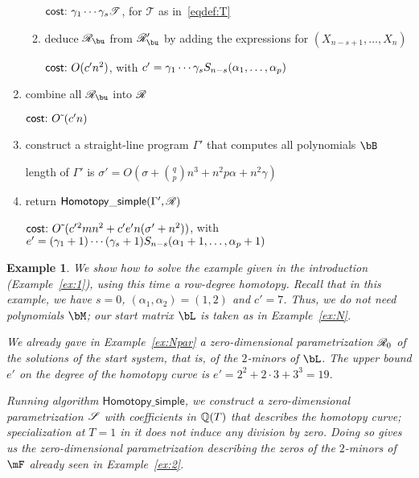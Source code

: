 \documentclass[12pt]{article}
\newtheorem{example}[definition]{Example}
\begin{document}
\begin{algorithm}[!t]
\begin{enumerate}
\begin{enumerate}
\hfill  $\text{\sf{cost:~}} \gamma_1 \cdots \gamma_s \mathscr{T}$, for $\mathscr{T}$ as in~\eqref{eqdef:T}

\item deduce $\scrR_\bu$ from $\scrR'_\bu$ by adding the expressions for $(X_{n-s+1},\dots,X_n)$
  
\hfill  $\text{\sf{cost:~}} O( {c'}{} n^2)$, with ${c'}{}= \gamma_1 \cdots \gamma_s S_{n-s}(\alpha_1,\dots,\alpha_p)$
\end{enumerate}
\item combine all $\scrR_\bu$ into $\mathscr{R}$

  \hfill $\text{\sf{cost:~}} {O}{\,\tilde{ }\,}( {c'}{} n)$

\item construct a straight-line program $\Gamma'$ that computes all polynomials $\bB$

  \hfill length of $\Gamma'$ is $\sigma'=O(\sigma + {q \choose p} n^3 + n^2 p \alpha + n^2\gamma)$

\item\label{step:final:rowdegreesimple} return $\mathsf{Homotopy\_simple}(\Gamma',\mathscr{R})$

  \hfill $\text{\sf{cost:~}} {O}{\,\tilde{ }\,}( {c'}{}^2 m n^2 + {c'}{} {e'}{} n (\sigma'  + n^2))$, 
with ${e'}{}=(\gamma_1+1) \cdots (\gamma_s+1) S_{n-s}(\alpha_1+1,\dots,\alpha_p+1)$
\end{enumerate}
\label{RowHom_simple}
\end{algorithm}



\begin{example}
  We show how to solve the example given in the introduction
  (Example~\ref{ex:1}), using this time a row-degree homotopy. Recall
  that in this example, we have $s=0$, $(\alpha_1,\alpha_2)=(1,2)$ and
  $c'=7$.  Thus, we do not need polynomials $\bM$; our start matrix
  $\bL$ is taken as in Example~\ref{ex:N}.

  We already gave in Example~\ref{ex:Npar} a zero-dimensional
  parametrization $\mathscr{R}_0$ of the solutions of the start system, that is, of
  the $2$-minors of $\bL$. The upper bound $e'$ on the degree 
  of the homotopy curve is $e'=2^2 + 2\cdot 3 + 3^3=19$.

  Running algorithm $\mathsf{Homotopy\_simple}$, we construct a
  zero-dimensional parametrization $\mathscr{S}$ with coefficients in
  $\mathbb{Q}(T)$ that describes the homotopy curve; specialization at $T=1$
  in it does not induce any division by zero. Doing so gives us the
  zero-dimensional parametrization describing the zeros of the
  $2$-minors of $\mF$ already seen in Example~\ref{ex:2}.
\end{example}
\end{document}
